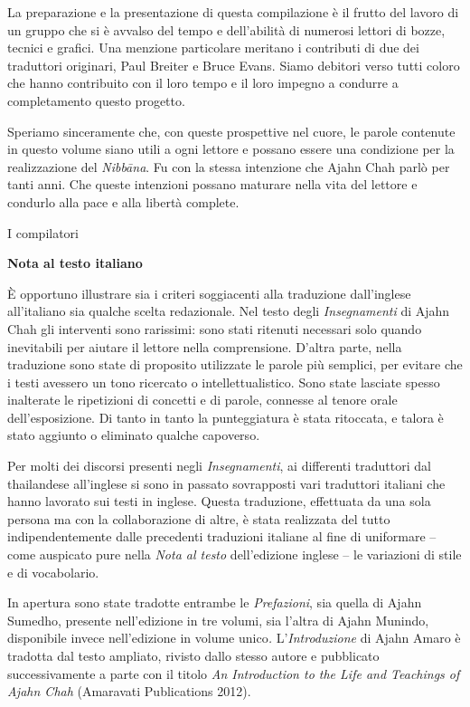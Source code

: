 La preparazione e la presentazione di questa compilazione è il frutto
del lavoro di un gruppo che si è avvalso del tempo e dell'abilità di
numerosi lettori di bozze, tecnici e grafici. Una menzione particolare
meritano i contributi di due dei traduttori originari, Paul Breiter e
Bruce Evans. Siamo debitori verso tutti coloro che hanno contribuito con
il loro tempo e il loro impegno a condurre a completamento questo
progetto.

Speriamo sinceramente che, con queste prospettive nel cuore, le parole
contenute in questo volume siano utili a ogni lettore e possano essere
una condizione per la realizzazione del \emph{Nibbāna}. Fu con la stessa
intenzione che Ajahn Chah parlò per tanti anni. Che queste intenzioni
possano maturare nella vita del lettore e condurlo alla pace e alla
libertà complete.

I compilatori

\textbf{Nota al testo italiano}

È opportuno illustrare sia i criteri soggiacenti alla traduzione
dall'inglese all'italiano sia qualche scelta redazionale. Nel testo
degli \emph{Insegnamenti} di Ajahn Chah gli interventi sono rarissimi:
sono stati ritenuti necessari solo quando inevitabili per aiutare il
lettore nella comprensione. D'altra parte, nella traduzione sono state
di proposito utilizzate le parole più semplici, per evitare che i testi
avessero un tono ricercato o intellettualistico. Sono state lasciate
spesso inalterate le ripetizioni di concetti e di parole, connesse al
tenore orale dell'esposizione. Di tanto in tanto la punteggiatura è
stata ritoccata, e talora è stato aggiunto o eliminato qualche
capoverso.

Per molti dei discorsi presenti negli \emph{Insegnamenti}, ai differenti
traduttori dal thailandese all'inglese si sono in passato sovrapposti
vari traduttori italiani che hanno lavorato sui testi in inglese. Questa
traduzione, effettuata da una sola persona ma con la collaborazione di
altre, è stata realizzata del tutto indipendentemente dalle precedenti
traduzioni italiane al fine di uniformare -- come auspicato pure nella
\emph{Nota al testo} dell'edizione inglese -- le variazioni di stile e
di vocabolario.

In apertura sono state tradotte entrambe le \emph{Prefazioni}, sia
quella di Ajahn Sumedho, presente nell'edizione in tre volumi, sia
l'altra di Ajahn Munindo, disponibile invece nell'edizione in volume
unico\emph{.} L'\emph{Introduzione} di Ajahn Amaro è tradotta dal testo
ampliato, rivisto dallo stesso autore e pubblicato successivamente a
parte con il titolo \emph{An Introduction to the Life and Teachings of
Ajahn Chah} (Amaravati Publications 2012).

